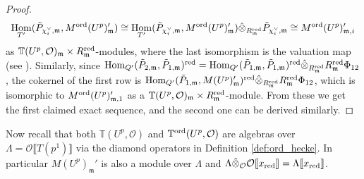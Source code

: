 \documentclass[leqno]{amsart}
\theoremstyle{definition}
\theoremstyle{remark}
\newcommand{\oo}{\mathcal{O}}
\DeclareMathOperator{\Hom}{Hom}
\newcommand{\fm}{\mathfrak{m}}
\newcommand{\red}{\textnormal{red}}
\newcommand{\xx}{x_\textnormal{red}}
\newcommand{\TT}{\mathbb{T}} %
\newcommand{\ord}{\textnormal{ord}} %
\begin{document}
\begin{proof}
\begin{equation}
    \Hom_{T'}(\tilde{P}_{\chi_i^\vee,\fm}, M^{\ord}(U^p)_\fm')\cong
    \Hom_{T'}(\tilde{P}_{\chi_i^\vee,\fm}, M^{\ord}(U^p)_\fm')
    \hat{\otimes}_{R^{\red}_\fm}\tilde{P}_{\chi_i^\vee,\fm}\cong
    M^{\ord}(U^p)_{\fm, i}'
\end{equation}
as $\TT(U^p,\oo)_\fm\times R_{\fm}^\red$-modules,
where the last isomorphism is the valuation map
(see \cite[Lem. 3.24]{pask}).
Similarly,  since
$\Hom_{Q'}(\tilde{P}_{2,\fm}, \tilde{P}_{1,\fm})^{\red}=
\Hom_{Q'}(\tilde{P}_{1,\fm}, \tilde{P}_{1,\fm})^{\red}
\hat{\otimes}_{R_\fm^\red}R_\fm^{\red}\Phi_{12}$,
the cokernel of the first row is
$\Hom_{Q'}(\tilde{P}_{1,\fm}, M(U^p)_{\fm}')^{\red}
\hat{\otimes}_{R_\fm^\red}R_\fm^{\red}\Phi_{12}$,
which is isomorphic to $M^{\ord}(U^p)_{\fm, 1}'$
as a $\TT(U^p,\oo)_\fm\times R_{\fm}^\red$-module.
From these we get the first claimed exact sequence,
and the second one can be derived similarly.
\end{proof}  

Now recall that both $\TT(U^p,\oo)$
and $\TT^{\ord}(U^p,\oo)$
are algebras over $\Lambda=\oo\llbracket T(p^1)\rrbracket$
via the diamond operators in Definition \ref{def:ord_hecke}.
In particular $M(U^p)_\fm'$ is also a module over $\Lambda$ and
$\Lambda\hat{\otimes}_{\oo}\oo\llbracket\xx\rrbracket=
\Lambda\llbracket\xx\rrbracket$.
\end{document}
